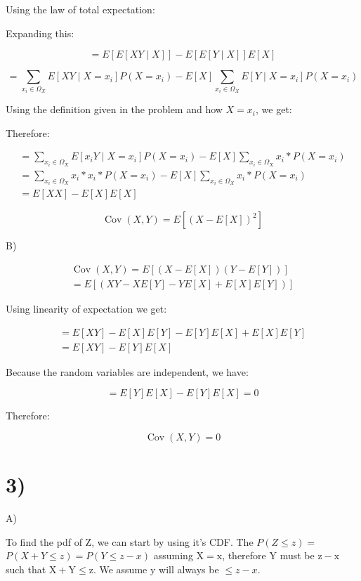 \documentclass[10pt]{article}
\begin{document}
Using the law of total expectation:

Expanding this:

$$
=E[E[X Y \mid X]]-E[E[Y \mid X]] E[X]
$$

$$
=\sum_{x_{i} \in \Omega_{X}} E\left[X Y \mid X=x_{i}\right] P\left(X=x_{i}\right)-E[X] \sum_{x_{i} \in \Omega_{X}} E\left[Y \mid X=x_{i}\right] P\left(X=x_{i}\right)
$$

Using the definition given in the problem and how $X=x_{i}$, we get:

Therefore:

$$
\begin{gathered}
=\sum_{x_{i} \in \Omega_{X}} E\left[x_{i} Y \mid X=x_{i}\right] P\left(X=x_{i}\right)-E[X] \sum_{x_{i} \in \Omega_{X}} x_{i} * P\left(X=x_{i}\right) \\
=\sum_{x_{i} \in \Omega_{X}} x_{i} * x_{i} * P\left(X=x_{i}\right)-E[X] \sum_{x_{i} \in \Omega_{X}} x_{i} * P\left(X=x_{i}\right) \\
=E[X X]-E[X] E[X]
\end{gathered}
$$

$$
\operatorname{Cov}(X, Y)=E\left[(X-E[X])^{2}\right]
$$

B)

$$
\begin{gathered}
\operatorname{Cov}(X, Y)=E[(X-E[X])(Y-E[Y])] \\
=E[(X Y-X E[Y]-Y E[X]+E[X] E[Y])]
\end{gathered}
$$

Using linearity of expectation we get:

$$
\begin{gathered}
=E[X Y]-E[X] E[Y]-E[Y] E[X]+E[X] E[Y] \\
=E[X Y]-E[Y] E[X]
\end{gathered}
$$

Because the random variables are independent, we have:

$$
=E[Y] E[X]-E[Y] E[X]=0
$$

Therefore:

$$
\operatorname{Cov}(X, Y)=0
$$
\newpage
\section*{3)}
A)

To find the pdf of Z, we can start by using it's CDF. The $P(Z \leq z)=$ $P(X+Y \leq z)=P(Y \leq z-x)$ assuming $\mathrm{X}=\mathrm{x}$, therefore $\mathrm{Y}$ must be $\mathrm{z}-\mathrm{x}$ such that $\mathrm{X}+\mathrm{Y} \leq \mathrm{z}$. We assume $\mathrm{y}$ will always be $\leq z-x$.
\end{document}
